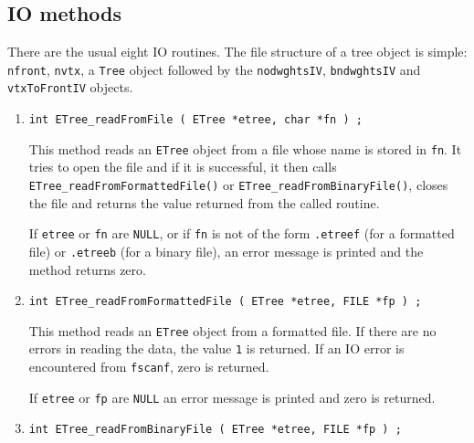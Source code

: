 \subsection{IO methods}
\label{subsection:ETree:proto:IO}
\par
There are the usual eight IO routines.
The file structure of a tree object is simple:
{\tt nfront}, {\tt nvtx},
a {\tt Tree} object followed by the
{\tt nodwghtsIV},
{\tt bndwghtsIV} and
{\tt vtxToFrontIV} objects.
\par
\begin{enumerate}
\item
\begin{verbatim}
int ETree_readFromFile ( ETree *etree, char *fn ) ;
\end{verbatim}
\par
This method reads an {\tt ETree} object from a file
whose name is stored in {\tt *fn}.
It tries to open the file and if it is successful, 
it then calls {\tt ETree\_readFromFormattedFile()} or
{\tt ETree\_readFromBinaryFile()}, 
closes the file
and returns the value returned from the called routine.
\par {}
If {\tt etree} or {\tt fn} are {\tt NULL}, 
or if {\tt fn} is not of the form
{\tt *.etreef} (for a formatted file) 
or {\tt *.etreeb} (for a binary file),
an error message is printed and the method returns zero.
\item
\begin{verbatim}
int ETree_readFromFormattedFile ( ETree *etree, FILE *fp ) ;
\end{verbatim}
\par
This method reads an {\tt ETree} object from a formatted file.
If there are no errors in reading the data, 
the value {\tt 1} is returned.
If an IO error is encountered from {\tt fscanf}, zero is returned.
\par {}
If {\tt etree} or {\tt fp} are {\tt NULL} 
an error message is printed and zero is returned.
\item
\begin{verbatim}
int ETree_readFromBinaryFile ( ETree *etree, FILE *fp ) ;

\end{verbatim}
\end{enumerate}
